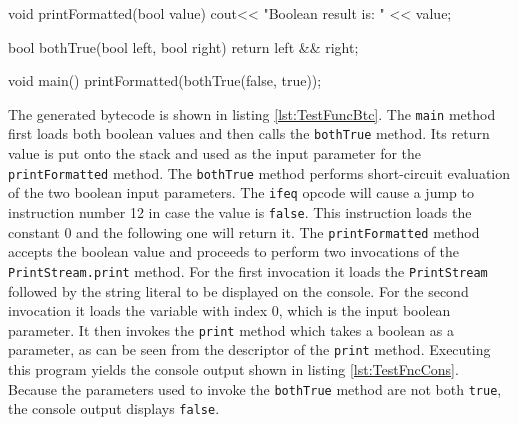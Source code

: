 \begin{CppCode}[float,numbers=none,caption=MiniC\texttt{++} source code of a application with functions., label=lst:TestFuncSrc]
void printFormatted(bool value) {
    cout<< "Boolean result is: " << value;
}

bool bothTrue(bool left, bool right) {
    return left && right;
}

void main() {
 printFormatted(bothTrue(false, true));
} 
\end{CppCode}


The generated bytecode is shown in listing \ref{lst:TestFuncBtc}. The \verb|main| method first loads both boolean values and then calls the \verb|bothTrue| method. Its return value is put onto the stack and used as the input parameter for the \verb|printFormatted| method. The \verb|bothTrue| method performs short-circuit evaluation of the two boolean input parameters. The \verb|ifeq| opcode will cause a jump to instruction number 12 in case the value is \verb|false|. This instruction loads the constant 0 and the following one will return it. The \verb|printFormatted| method accepts the boolean value and proceeds to perform two invocations of the \verb|PrintStream.print| method. For the first invocation it loads the \verb|PrintStream| followed by the string literal to be displayed on the console. For the second invocation it loads the variable with index 0, which is the input boolean parameter. It then invokes the \verb|print| method which takes a boolean as a parameter, as can be seen from the descriptor of the \verb|print| method. Executing this program yields the console output shown in listing \ref{lst:TestFncCons}. Because the parameters used to invoke the \verb|bothTrue| method are not both \verb|true|, the console output displays \verb|false|.


